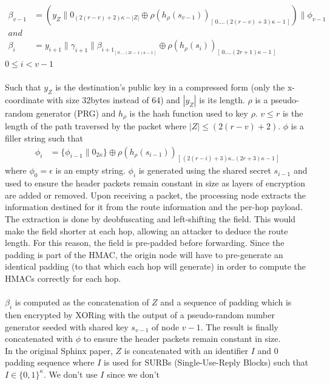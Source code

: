 \begin{align}  
    \beta_{v-1} &=(y_Z\|0_{(2(r-v)+2)\kappa-|Z|}\oplus \rho(h_{\rho}(s_{v-1}))_{[ \,0....(2(r-v)+3)\kappa-1\,]})\|\phi_{v-1}\\
    and &\nonumber \\
    \beta_i &=y_{i+1}\|\gamma_{i+1}\|\beta_{{i+1}_{[ \,0....(2r-1)\kappa-1\,] }}\oplus \rho(h_{\rho}(s_{i}))_{[ \,0....(2r+1)\kappa-1\,]} 
    \label{eq:2}
\end{align}
$0\le i < v-1$
\\~\\Such that $y_Z$ is the destination's public key in a compressed form (only the x-coordinate with size 32bytes instead of 64) and $|y_Z|$ is its length. $\rho$ is a pseudo-random generator (PRG) and $h_{\rho}$ is the hash function used to key $\rho$.
$v\leq r$ is the length of the path traversed by the packet where $|Z| \leq (2(r - v) + 2)$. $\phi$ is a filler string such that
\begin{align}  
    \phi_i&=\{ \phi_{i-1}\|0_{2\kappa}\}\oplus \rho(h_{\rho}(s_{i-1}))_{[ \,(2(r-i)+3)\kappa..(2r+3)\kappa-1\,]}
\end{align}
where $\phi_0=\epsilon$ is an empty string. $\phi_i$ is generated using the shared secret $s_{i-1}$ and used to ensure the header packets remain constant in size as layers of encryption are added or removed. Upon receiving a packet, the processing node extracts the information destined for it from the route information and the per-hop payload. The extraction is done by deobfuscating and left-shifting the field. This would make the field shorter at each hop, allowing an attacker to deduce the route length. For this reason, the field is pre-padded before forwarding. Since the padding is part of the HMAC, the origin node will have to pre-generate an identical padding (to that which each hop will generate) in order to compute the HMACs correctly for each hop.
    \\~\\$\beta_i$ is computed as the concatenation of $Z$ and a sequence of padding which is then encrypted by XORing with the output of a pseudo-random number generator seeded with shared key $s_{v-1}$ of node $v-1$. The result is finally concatenated with $\phi$ to ensure the header packets remain constant in size.
    \\In the original Sphinx paper, $Z$ is concatenated with an identifier $I$
    and $0$ padding sequence where $I$ is used for SURBs (Single-Use-Reply
    Blocks) such that $I \in \{0, 1\}^\kappa$. We don't use $I$ since we don't
